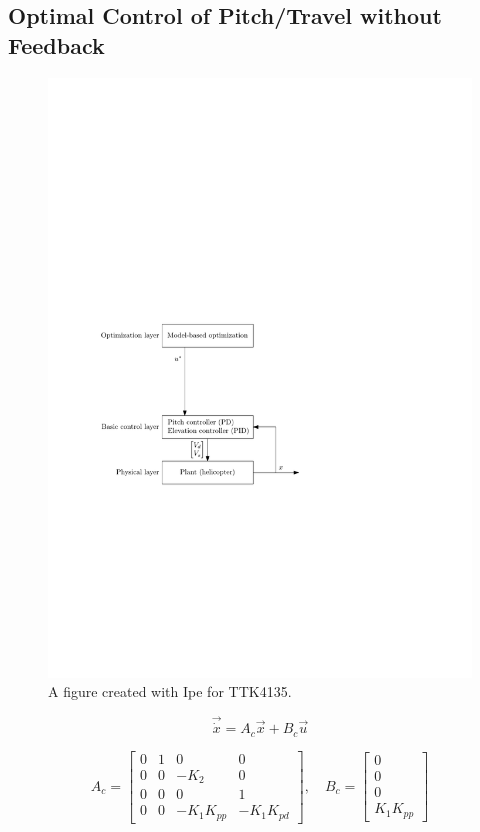 \documentclass[11pt, a4paper, USenglish]{article} %
\begin{document}
\subsection{Optimal Control of Pitch/Travel without Feedback}
\begin{figure}[H]
    \centering
    \includegraphics[width=1.00\textwidth]{figures/layers_openloop.pdf}
    \caption{A figure created with Ipe for TTK4135.}
\label{fig:layers_openloop}
\end{figure}

\begin{equation}
    \vec{\dot{x}} = A_c\vec{x} + B_c \vec{u} 
\end{equation}

\begin{equation*}
A_c =
    \begin{bmatrix}
        0 &  1 &  0 & 0 \\
        0 &  0 &  -K_2 & 0  \\
        0 &  0 &  0 & 1 \\
        0 &  0 & -K_1K_{pp} & -K_1K_{pd}                                 
    \end{bmatrix}
    , \quad B_c = 
    \begin{bmatrix} 0 \\ 0 \\ 0 \\ K_1K_{pp} \end{bmatrix}
\end{equation*}
\end{document}
